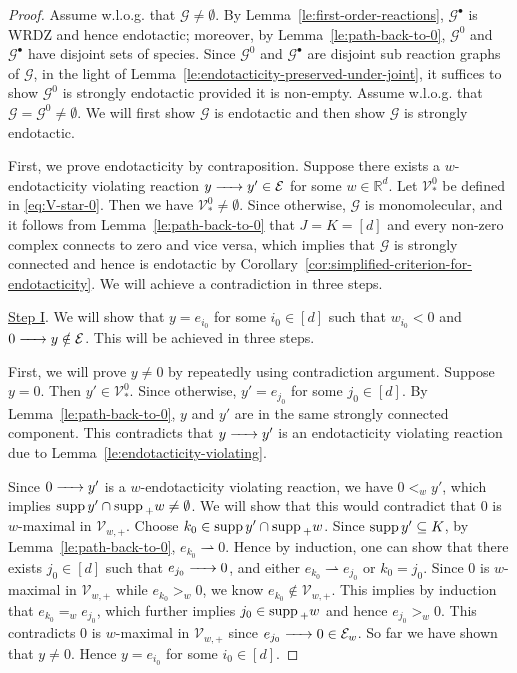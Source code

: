 \documentclass[10pt]{amsart}
\numberwithin{equation}{section}
\theoremstyle{plain}
\theoremstyle{definition}
\theoremstyle{remark}
\newcommand{\cE}{\mathcal{E}}
\newcommand{\cG}{\mathcal{G}}
\newcommand{\cV}{\mathcal{V}}
\newcommand{\supp}{{\rm supp\,}}
\begin{document}
\begin{proof}
Assume w.l.o.g. that $\cG\neq\emptyset$. By Lemma~\ref{le:first-order-reactions}, $\cG^{\bullet}$ is WRDZ and hence endotactic; moreover, by Lemma~\ref{le:path-back-to-0}, $\cG^0$ and $\cG^{\bullet}$ have  disjoint sets of species. Since $\cG^0$ and $\cG^{\bullet}$ are disjoint sub reaction graphs of $\cG$, in the light of Lemma~\ref{le:endotacticity-preserved-under-joint}, it suffices to show $\cG^0$ is strongly endotactic provided it is non-empty. Assume w.l.o.g. that $\cG=\cG^0\neq\emptyset$. We will first show $\cG$ is endotactic and then show $\cG$ is strongly endotactic.

First, we prove endotacticity by contraposition. Suppose there exists a $w$-endotacticity violating reaction $y\ce{->[]} y'\in\cE$ for some $w\in\mathbb{R}^d$. Let $\cV_*^0$ be defined in \eqref{eq:V-star-0}. Then we have $\cV_*^0\neq\emptyset$. 
 Since otherwise, $\cG$ is monomolecular, and it follows from Lemma~\ref{le:path-back-to-0} that $J=K=[d]$ and  every non-zero complex connects to zero and vice versa, which implies that $\cG$ is strongly connected and hence is endotactic by Corollary~\ref{cor:simplified-criterion-for-endotacticity}.  We will achieve a contradiction in three steps.
\medskip


\noindent\underline{Step I}. We will show that $y=e_{i_0}$ for some $i_0\in[d]$ such that $w_{i_0}<0$ and $0\ce{->} y\notin\cE$. This will be achieved in three steps.

First, we will prove $y\neq0$ by repeatedly using contradiction argument. Suppose $y=0$. Then $y'\in\cV^0_*$. Since otherwise, $y'=e_{j_0}$ for some $j_0\in[d]$. By Lemma~\ref{le:path-back-to-0}, $y$ and $y'$ are in the same strongly connected component. This contradicts that $y\ce{->}y'$ is an endotacticity violating reaction due to Lemma~\ref{le:endotacticity-violating}.

Since $0\ce{->}y'$ is a $w$-endotacticity violating reaction, we have  $0<_wy'$, which implies $\supp y'\cap\supp_+w\neq\emptyset$.
We will show that this would contradict that $0$ is $w$-maximal in $\cV_{w,+}$. Choose $k_0\in\supp y'\cap \supp_+w$. Since $\supp y'\subseteq K$, by Lemma~\ref{le:path-back-to-0}, $e_{k_0}\rightharpoonup 0$. Hence by induction, one can show that there exists $j_0\in[d]$ such that $e_{j_0}\ce{->}0$, and either $e_{k_0}\rightharpoonup e_{j_0}$ or ${k_0}=j_0$. Since $0$ is $w$-maximal in $\cV_{w,+}$ while $e_{k_0}>_w0$, we know $e_{k_0}\notin\cV_{w,+}$. This implies by induction that $e_{k_0}=_we_{j_0}$, which further implies $j_0\in\supp_+w$ and hence $e_{j_0}>_w0$. This contradicts $0$ is $w$-maximal in $\cV_{w,+}$ since $e_{j_0}\ce{->}0\in\cE_w$.  So far we have shown that $y\neq0$. Hence $y=e_{i_0}$ for some $i_0\in[d]$.


\end{proof}
\end{document}
